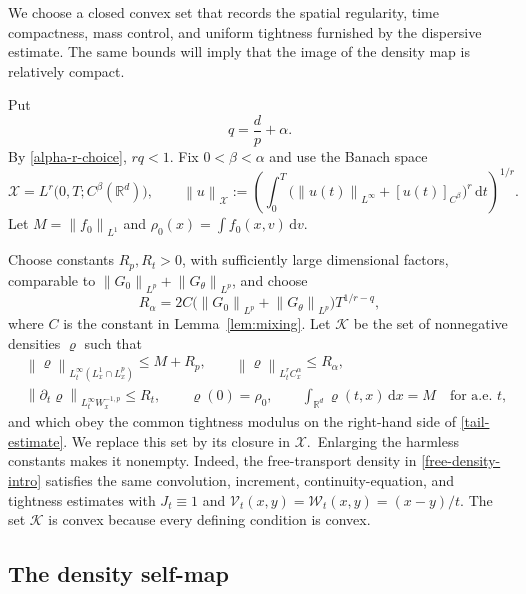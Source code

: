 \documentclass[11pt]{article}
\newcommand{\R}{\mathbb R}
\newcommand{\norm}[1]{\left\lVert #1\right\rVert}
\newcommand{\dd}{\,\mathrm d}
\begin{document}
We choose a closed convex set that records the spatial
regularity, time compactness, mass control, and uniform tightness furnished
by the dispersive estimate.  The same bounds will imply that the image of
the density map is relatively compact.

Put
\begin{equation}\label{qdef}
 q=\frac dp+\alpha.
\end{equation}
By \eqref{alpha-r-choice}, $rq<1$.  Fix
$0<\beta<\alpha$ and use the Banach space
\begin{equation}\label{fixed-point-space}
 \mathcal X=L^r\big(0,T;C^\beta(\R^d)\big),\qquad
 \norm{u}_{\mathcal X}
 :=\left(\int_0^T
   \big(\norm{u(t)}_{L^\infty}+[u(t)]_{C^\beta}\big)^r\dd t\right)^{1/r}.
\end{equation}
Let  $M=\norm{f_0}_{L^1}$  and
$\rho_0(x)=\int f_0(x,v)\dd v$.

Choose constants $R_p,R_t>0$, with sufficiently large dimensional factors,
comparable to
 $\norm{G_0}_{L^p}+\norm{G_\theta}_{L^p}$, and choose
 \begin{equation}\label{Ralpha}
 R_\alpha=2C\big(\norm{G_0}_{L^p}+\norm{G_\theta}_{L^p}\big)T^{1/r-q},
\end{equation} 
where $C$ is the constant in Lemma~\ref{lem:mixing}.  Let $\mathcal K$ be
the set of nonnegative densities $\varrho$ such that
 \begin{align}
 &\norm{\varrho}_{L^\infty_t(L^1_x\cap L^p_x)}\leq M+R_p,
 \qquad \norm{\varrho}_{L^r_tC^\alpha_x}\leq R_\alpha,
 \label{K-spatial}\\
 &\norm{\partial_t\varrho}_{L^\infty_tW^{-1,p}_x}\leq R_t,
 \qquad \varrho(0)=\rho_0,\qquad
 \int_{\R^d}\varrho(t,x)\dd x=M\quad\text{for a.e. }t,
 \label{K-time}
\end{align} 
and which obey the common tightness modulus on the right-hand side of
\eqref{tail-estimate}.  We replace this set by its closure
in $\mathcal X$.\  Enlarging the harmless constants makes it
nonempty.  Indeed, the free-transport density in
\eqref{free-density-intro} satisfies the same convolution, increment,
continuity-equation, and tightness estimates with $J_t\equiv1$ and
$\mathcal V_t(x,y)=\mathcal W_t(x,y)=(x-y)/t$.  The set $\mathcal K$ is
convex because every defining
condition is convex.

\subsection{The density self-map}
\end{document}
